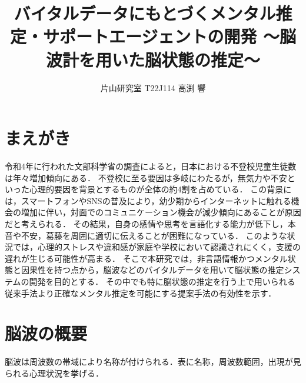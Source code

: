 \documentclass[twocolumn,a4paper,dvipdfmx]{klabAbst}
\title{\bf バイタルデータにもとづくメンタル推定・サポートエージェントの開発 ～脳波計を用いた脳状態の推定～}
\author{片山研究室 T22J114 高渕 響}
\begin{document}
\maketitle
\thispagestyle{plain} %
\pagestyle{plain}     %



\section{まえがき}
令和4年に行われた文部科学省の調査によると，日本における不登校児童生徒数は年々増加傾向にある．
不登校に至る要因は多岐にわたるが，無気力や不安といった心理的要因を背景とするものが全体の約4割を占めている．
この背景には，スマートフォンやSNSの普及により，幼少期からインターネットに触れる機会の増加に伴い，対面でのコミュニケーション機会が減少傾向にあることが原因だと考えられる．
その結果，自身の感情や思考を言語化する能力が低下し，本音や不安，葛藤を周囲に適切に伝えることが困難になっている．
このような状況では，心理的ストレスや違和感が家庭や学校において認識されにくく，支援の遅れが生じる可能性が高まる．
そこで本研究では，非言語情報かつメンタル状態と因果性を持つ点から，脳波などのバイタルデータを用いて脳状態の推定システムの開発を目的とする．
その中でも特に脳状態の推定を行う上で用いられる従来手法より正確なメンタル推定を可能にする提案手法の有効性を示す．

\section{脳波の概要}
脳波は周波数の帯域により名称が付けられる．表に名称，周波数範囲，出現が見られる心理状況を挙げる．


\vspace{-3mm}
\end{document}
